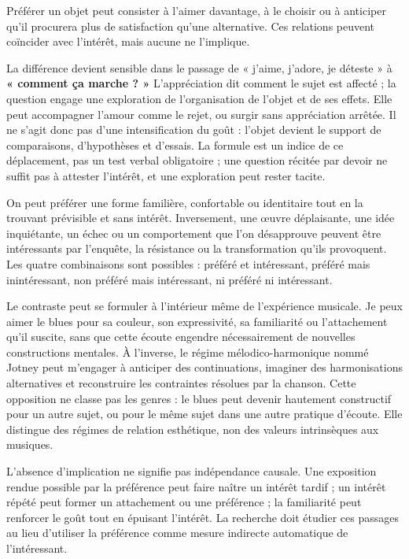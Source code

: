 \documentclass[10pt,a4paper]{article}
\begin{document}
Préférer un objet peut consister à l'aimer davantage, à le choisir ou à anticiper qu'il procurera plus de satisfaction qu'une alternative. Ces relations peuvent coïncider avec l'intérêt, mais aucune ne l'implique.

La différence devient sensible dans le passage de « j'aime, j'adore, je déteste » à \textbf{« comment ça marche ? »} L'appréciation dit comment le sujet est affecté ; la question engage une exploration de l'organisation de l'objet et de ses effets. Elle peut accompagner l'amour comme le rejet, ou surgir sans appréciation arrêtée. Il ne s'agit donc pas d'une intensification du goût : l'objet devient le support de comparaisons, d'hypothèses et d'essais. La formule est un indice de ce déplacement, pas un test verbal obligatoire ; une question récitée par devoir ne suffit pas à attester l'intérêt, et une exploration peut rester tacite.

On peut préférer une forme familière, confortable ou identitaire tout en la trouvant prévisible et sans intérêt. Inversement, une œuvre déplaisante, une idée inquiétante, un échec ou un comportement que l'on désapprouve peuvent être intéressants par l'enquête, la résistance ou la transformation qu'ils provoquent. Les quatre combinaisons sont possibles : préféré et intéressant, préféré mais inintéressant, non préféré mais intéressant, ni préféré ni intéressant.

Le contraste peut se formuler à l'intérieur même de l'expérience musicale. Je peux aimer le blues pour sa couleur, son expressivité, sa familiarité ou l'attachement qu'il suscite, sans que cette écoute engendre nécessairement de nouvelles constructions mentales. À l'inverse, le régime mélodico-harmonique nommé Jotney peut m'engager à anticiper des continuations, imaginer des harmonisations alternatives et reconstruire les contraintes résolues par la chanson. Cette opposition ne classe pas les genres : le blues peut devenir hautement constructif pour un autre sujet, ou pour le même sujet dans une autre pratique d'écoute. Elle distingue des régimes de relation esthétique, non des valeurs intrinsèques aux musiques.

L'absence d'implication ne signifie pas indépendance causale. Une exposition rendue possible par la préférence peut faire naître un intérêt tardif ; un intérêt répété peut former un attachement ou une préférence ; la familiarité peut renforcer le goût tout en épuisant l'intérêt. La recherche doit étudier ces passages au lieu d'utiliser la préférence comme mesure indirecte automatique de l'intéressant.
\end{document}

